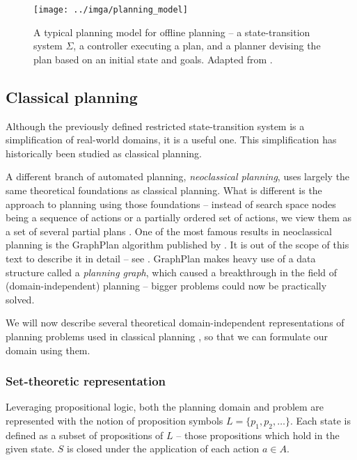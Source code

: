 \begin{figure}[tb]
\begin{center}
\texttt{[image: ../imga/planning\_model]}
\end{center}
\caption{A typical planning model for offline planning -- a state-transition system $\Sigma$, a controller executing a plan, and a planner devising the plan based on an initial state and goals. Adapted from \citep[Figure~1.3]{Ghallab2004}.}
\label{fig:planning-model}
\end{figure}

\subsection{Classical planning}\label{classical-planning}

Although the previously defined restricted state-transition system is a simplification of real-world
domains, it is a useful one. 
This simplification has historically been studied as classical planning.

A different branch of automated planning, \textit{neoclassical planning},
uses largely the same theoretical foundations as classical 
planning. What is different is the approach to planning using those foundations
-- instead of search space nodes being a sequence of actions or a partially ordered
set of actions, we view them as a set of several partial plans
\citep[Part~II]{Ghallab2004}.
One of the most famous results in neoclassical planning is the GraphPlan algorithm
published by \citet{Blum1997}. It is out of the scope of this text to describe it in detail
-- see \citet[Section~6.3]{Ghallab2004}.
GraphPlan makes heavy use of a data structure called a \textit{planning graph},
which caused a breakthrough in the field of (domain-independent) planning
-- bigger problems could now be practically solved.

We will now describe several theoretical domain-independent representations
of planning problems used in classical planning \citep[Chapter~2]{Ghallab2004},
so that we can formulate our domain using them.

\subsubsection{Set-theoretic representation}

Leveraging propositional logic, both the planning domain and problem
are represented with the notion
of proposition symbols $L = \{p_1, p_2, \ldots\}$.
Each state is defined as a subset of propositions of $L$ -- those propositions
which hold in the given state. $S$ is closed under the application of each
action $a \in A$.

